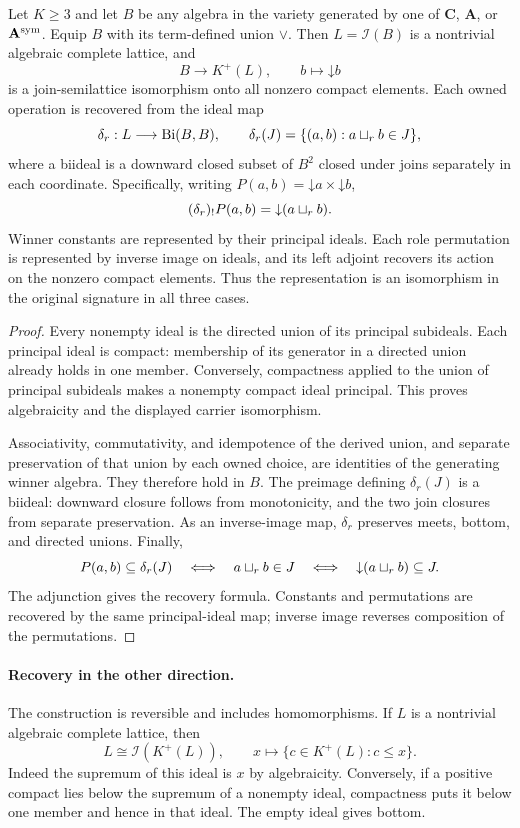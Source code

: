 \begin{theorem}\label{olv:thm:ideal-representation}
Let $K\geq3$ and let $B$ be any algebra in the variety generated by one of
$\mathbf C$, $\mathbf A$, or $\mathbf A^{\rm sym}$. Equip $B$ with its
term-defined union $\vee$. Then $L=\mathcal I(B)$ is a nontrivial algebraic
complete lattice, and
\[
 B\longrightarrow K^+(L),\qquad b\longmapsto\mathord\downarrow b
\]
is a join-semilattice isomorphism onto all nonzero compact elements.
Each owned operation is recovered from the ideal map
\[
 \delta_r:L\longrightarrow\operatorname{Bi}(B,B),\qquad
 \delta_r(J)=\{(a,b):a\mathbin{\sqcup_{r}} b\in J\},
\]
where a biideal is a downward closed subset of $B^2$ closed under joins
separately in each coordinate. Specifically, writing
$P(a,b)=\mathord\downarrow a\times\mathord\downarrow b$,
\[
 (\delta_r)_!P(a,b)=\mathord\downarrow(a\mathbin{\sqcup_{r}} b).
\]
Winner constants are represented by their principal ideals. Each role
permutation is represented by inverse image on ideals, and its left
adjoint recovers its action on the nonzero compact elements. Thus the
representation is an isomorphism in the original signature in all three
cases.
\end{theorem}
\begin{proof}
Every nonempty ideal is the directed union of its principal subideals.
Each principal ideal is compact: membership of its generator in a directed
union already holds in one member. Conversely, compactness applied to
the union of principal subideals makes a nonempty compact ideal principal.
This proves algebraicity and the displayed carrier isomorphism.

Associativity, commutativity, and idempotence of the derived union, and
separate preservation of that union by each owned choice, are identities
of the generating winner algebra. They therefore hold in $B$. The
preimage defining $\delta_r(J)$ is a biideal: downward closure follows
from monotonicity, and the two join closures from separate preservation.
As an inverse-image map, $\delta_r$ preserves meets, bottom, and directed
unions. Finally,
\[
 P(a,b)\subseteq\delta_r(J)
 \quad\Longleftrightarrow\quad a\mathbin{\sqcup_{r}} b\in J
 \quad\Longleftrightarrow\quad
 \mathord\downarrow(a\mathbin{\sqcup_{r}} b)\subseteq J.
\]
The adjunction gives the recovery formula. Constants and permutations
are recovered by the same principal-ideal map; inverse image reverses
composition of the permutations.
\end{proof}

\paragraph{Recovery in the other direction.}
The construction is reversible and includes homomorphisms. If $L$ is a
nontrivial algebraic complete lattice, then
\[
 L\cong\mathcal I(K^+(L)),\qquad
 x\longmapsto\{c\in K^+(L):c\leq x\}.
\]
Indeed the supremum of this ideal is $x$ by algebraicity. Conversely, if
a positive compact lies below the supremum of a nonempty ideal, compactness
puts it below one member and hence in that ideal. The empty ideal gives
bottom.

